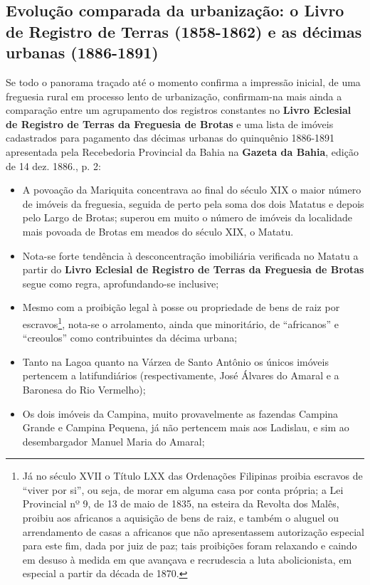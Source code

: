 \begin{citacao}
\subsection{Evolução comparada da urbanização: o Livro de Registro de Terras (1858-1862) e as décimas urbanas (1886-1891)}

Se todo o panorama traçado até o momento confirma a impressão inicial, de uma freguesia rural em processo lento de urbanização, confirmam-na mais ainda a comparação entre um agrupamento dos registros constantes no \textbf{Livro Eclesial de Registro de Terras da Freguesia de Brotas} e uma lista de imóveis cadastrados para pagamento das décimas urbanas do quinquênio 1886-1891 apresentada pela Recebedoria Provincial da Bahia na \textbf{Gazeta da Bahia}, edição de 14 dez. 1886., p. 2:

\begin{itemize}
\item A povoação da Mariquita concentrava ao final do século XIX o maior número de imóveis da freguesia, seguida de perto pela soma dos dois Matatus e depois pelo Largo de Brotas; superou em muito o número de imóveis da localidade mais povoada de Brotas em meados do século XIX, o Matatu.
\item Nota-se forte tendência à desconcentração imobiliária verificada no Matatu a partir do \textbf{Livro Eclesial de Registro de Terras da Freguesia de Brotas} segue como regra, aprofundando-se inclusive;
\item Mesmo com a proibição legal à posse ou propriedade de bens de raiz por escravos\footnote{Já no século XVII o Título LXX das Ordenações Filipinas proibia escravos de ``viver por si'', ou seja, de morar em alguma casa por conta própria; a Lei Provincial nº 9, de 13 de maio de 1835, na esteira da Revolta dos Malês, proibiu aos africanos a aquisição de bens de raiz, e também o aluguel ou arrendamento de casas a africanos que não apresentassem autorização especial para este fim, dada por juiz de paz; tais proibições foram relaxando e caindo em desuso à medida em que avançava e recrudescia a luta abolicionista, em especial a partir da década de 1870.}, nota-se o arrolamento, ainda que minoritário, de ``africanos'' e ``creoulos'' como contribuintes da décima urbana;
\item Tanto na Lagoa quanto na Várzea de Santo Antônio os únicos imóveis pertencem a latifundiários (respectivamente, José Álvares do Amaral e a Baronesa do Rio Vermelho);
\item Os dois imóveis da Campina, muito provavelmente as fazendas Campina Grande e Campina Pequena, já não pertencem mais aos Ladislau, e sim ao desembargador Manuel Maria do Amaral;

\end{itemize}
\end{citacao}
